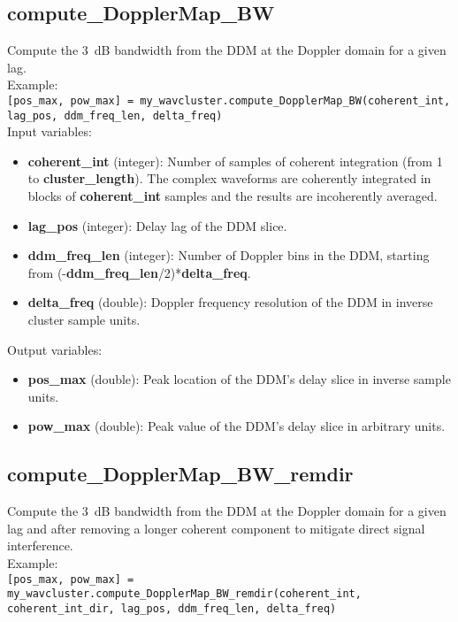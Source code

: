\subsection{compute\_DopplerMap\_BW}

Compute the 3~dB bandwidth from the DDM at the Doppler domain for a given lag.\\

Example:\\

\texttt{[pos\_max, pow\_max] = my\_wavcluster.compute\_DopplerMap\_BW(coherent\_int, lag\_pos, ddm\_freq\_len, delta\_freq)}\\

Input variables:
\begin{itemize}
\item {\bf coherent\_int} (integer): Number of samples of coherent integration (from 1 to {\bf cluster\_length}). The complex waveforms are coherently integrated in blocks of {\bf coherent\_int} samples and the results are incoherently averaged.
\item {\bf lag\_pos} (integer): Delay lag of the DDM slice.
\item {\bf ddm\_freq\_len} (integer): Number of Doppler bins in the DDM, starting from (-{\bf ddm\_freq\_len}/2)*{\bf delta\_freq}.
\item {\bf delta\_freq} (double): Doppler frequency resolution of the DDM in inverse cluster sample units.
\end{itemize}

Output variables:
\begin{itemize}
\item {\bf pos\_max} (double): Peak location of the DDM's delay slice in inverse sample units.
\item {\bf pow\_max} (double): Peak value of the DDM's delay slice in arbitrary units.
\end{itemize}


\subsection{compute\_DopplerMap\_BW\_remdir}

Compute the 3~dB bandwidth from the DDM at the Doppler domain for a given lag and after removing a longer coherent component to mitigate direct signal interference.\\

Example:\\

\texttt{[pos\_max, pow\_max] = my\_wavcluster.compute\_DopplerMap\_BW\_remdir(coherent\_int, coherent\_int\_dir, lag\_pos, ddm\_freq\_len, delta\_freq)}\\

